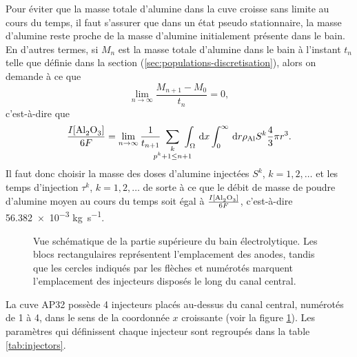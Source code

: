Pour éviter que la masse totale d'alumine dans la cuve croisse sans
limite au cours du temps, il faut s'assurer que dans un état pseudo
stationnaire, la masse d'alumine reste proche de la masse d'alumine
initialement présente dans le bain. En d'autres termes, si $M_n$ est
la masse totale d'alumine dans le bain à l'instant $t_n$ telle que
définie dans la section (\ref{sec:populations-discretisation}), alors
on demande à ce que
\begin{equation*}
\lim_{n\to\infty} \frac{M_{n+1} - M_{0}}{t_n} = 0,
\end{equation*}
c'est-à-dire que
\begin{equation}\label{eq:injection-mass-condition}
  \frac{I[\cee{Al2O3}]}{6F}
  =\lim_{n\to \infty}\frac{1}{t_{n+1}}\ \sum_{\mathclap{\substack{k\\ p^k + 1\leq n +
        1}}}\ \int_\Omega\intd{x}\int_0^\infty\intd{r}\aluminadensity S^k \frac{4}{3}\pi r^3.
\end{equation}
Il faut donc choisir la masse des doses d'alumine injectées $S^k$, $k
= 1, 2,\dots$ et les temps d'injection $\tau^k$, $k = 1,2,\dots$ de
sorte à ce que le débit de masse de poudre d'alumine moyen au cours du
temps soit égal à $\frac{I[\cee{Al2O3}]}{6F}$, c'est-à-dire
\num{56.382e-3} \si{\kilo\gram\per\second}.

\begin{figure}
  \begin{center}
    
    \caption{Vue schématique de la partie supérieure du bain
      électrolytique. Les blocs rectangulaires représentent
      l'emplacement des anodes, tandis que les cercles indiqués par
      les flèches et numérotés marquent l'emplacement des injecteurs
      disposés le long du canal central.}
    \label{fig:anode-configuration}
  \end{center}
\end{figure}

La cuve AP32 possède 4 injecteurs placés au-dessus du canal central,
numérotés de 1 à 4, dans le sens de la coordonnée $x$ croissante (voir
la figure \ref{fig:anode-configuration}). Les paramètres qui
définissent chaque injecteur sont regroupés dans la table
\ref{tab:injectors}.

